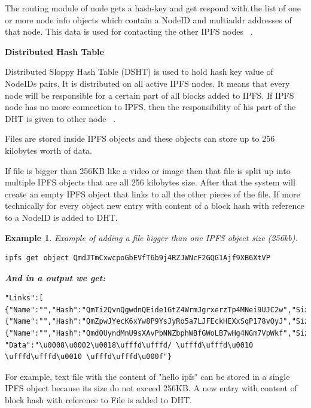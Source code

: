 \documentclass[a4paper,12pt,fleqn]{article}
\newtheorem{exmp}{Example}[subsection]
\begin{document}
The routing module of node gets a hash-key and get respond with the list of one or more node info objects which contain a NodeID and multiaddr addresses of that node. This data is used for contacting the other IPFS nodes ~\cite{benet2014ipfs}.
\newline

\textbf{Distributed Hash Table}
\newline

 Distributed Sloppy Hash Table (DSHT) is used to hold hash key value of NodeIDs pairs. It is distributed on all active IPFS nodes. It means that every node will be responsible for a certain part of all blocks added to IPFS. If IPFS node has no more connection to IPFS, then the responsibility of his part of the DHT is given to other node ~\cite{benet2014ipfs}. 

Files are stored inside IPFS objects and these objects can store up to 256 kilobytes worth of data. 

If file is bigger than 256KB like a video or image then that file is split up into multiple IPFS objects that are all 256 kilobytes size. After that the system will create an empty IPFS object that links to all the other pieces of the file. If more technically for every object new entry with content of a block hash with reference to a NodeID is added to DHT. 

\begin{exmp} Example of adding a file bigger than one IPFS object size (256kb).

\begin{lstlisting}[caption={Requesting IPFS objects of file > 256kb.},label={abc}]
ipfs get object QmdJTmCxwcpoGbEVfT6b9j4RZJWNcF2GQG1Ajf9XB6XtVP
\end{lstlisting}
\textbf{And in a output we get:}
\begin{lstlisting}[caption={Created IPFS objects of file > 256kb.},label={abc}]
"Links":[
{"Name":"","Hash":"QmTi2QvnQgwdnQEide1GtZ4WrmJgrxerzTp4MNei9UJC2w","Size":262158},
{"Name":"","Hash":"QmZpwJYecK6xYw8P9YsJyRo5a7LJFEckHEXxSqP178vQyJ","Size":262158},
{"Name":"","Hash":"QmdQUyndMnU9sXAvPbNNZbphWBfGWoLB7wHg4NGm7VpWkf","Size":255406}],
"Data":"\u0008\u0002\u0018\ufffd\ufffd/ \ufffd\ufffd\u0010 \ufffd\ufffd\u0010 \ufffd\ufffd\u000f"}
\end{lstlisting}

\end{exmp}

For example, text file with the content of "hello ipfs" can be stored in a single IPFS object because its size do not exceed 256KB. A new entry with content of block hash with reference to File is added to DHT.
\end{document}
